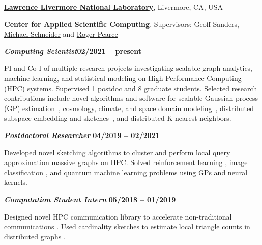 \href{https://www.llnl.gov/}{\textbf{Lawrence Livermore National Laboratory}},
Livermore, CA, USA

\href{https://computation.llnl.gov/casc/}{\textbf{Center for Applied Scientific Computing}}.
Supervisors:
\href{https://people.llnl.gov/sanders29}{Geoff Sanders},
\href{https://pls.llnl.gov/people/staff-bios/physics/schneider-m}
{Michael Schneider}
and
\href{https://people.llnl.gov/pearce7}{Roger Pearce}

\vspace{-0.5em}

\begin{outerlist}

  \vspace{-0.5em}

  \item[] \textbf{\textit{Computing Scientist}}\hfill \textbf{02/2021 -- present}

  \vspace{-0.5em}

  PI and Co-I of multiple research projects investigating scalable graph
  analytics, machine learning, and statistical modeling on High-Performance
  Computing (HPC) systems.
  Supervised 1 postdoc and 8 graduate students.
  Selected research contributions include novel algorithms and software for
  scalable Gaussian process (GP) estimation~\cite{muyskens2021muygps}, cosmology,
  climate, and space domain modeling~\cite{muyskens2022star}, distributed
  subspace embedding and sketches~\cite{priest2020scaling}, and distributed K
  nearest neighbors.

  \vspace{-0.5em}

  \item[] \textbf{\textit{Postdoctoral Researcher}}%
  \hfill \textbf{04/2019 -- 02/2021}

  \vspace{-0.5em}

  Developed novel sketching algorithms to cluster \cite{priest2020scaling} and
  perform local query approximation \cite{priest2020degreesketch} massive graphs
  on HPC.
  Solved reinforcement learning \cite{goumiri2020reinforcement}, image
  classification \cite{goumiri2020star}, and quantum machine learning
  \cite{otten2020quantum} problems using GPs and neural kernels.

  \vspace{-0.5em}

  \item[] \textbf{\textit{Computation Student Intern}}%
  \hfill \textbf{05/2018 -- 01/2019}

  \vspace{-0.5em}

  Designed novel HPC communication library to accelerate non-traditional
  communications \cite{priest2019you}.
  Used cardinality sketches to estimate local triangle counts in distributed
  graphs \cite{priest2018estimating}.

\end{outerlist}
